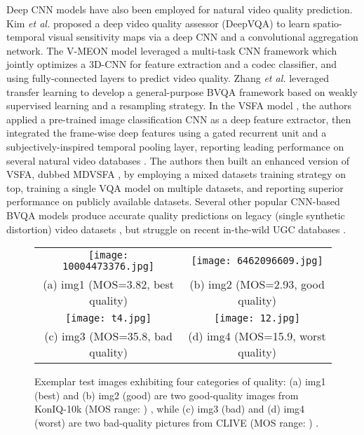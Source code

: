 \documentclass[transmag]{IEEEtran}
\begin{document}
Deep CNN models have also been employed for natural video quality
prediction. Kim \textit{et al.} \cite{kim2018deep} proposed a deep video quality assessor (DeepVQA) to learn spatio-temporal visual sensitivity maps via a deep CNN and a convolutional aggregation network. The V-MEON model \cite{liu2018end} leveraged a multi-task CNN framework which jointly optimizes a 3D-CNN for feature extraction and a codec classifier, and using fully-connected layers to predict video quality. Zhang \textit{et al.} \cite{zhang2018blind} leveraged transfer learning to develop a general-purpose BVQA framework based on weakly supervised learning and a resampling strategy. In the VSFA model \cite{li2019quality}, the authors applied a pre-trained image classification CNN as a deep feature extractor, then integrated the frame-wise deep features using a gated recurrent unit and a subjectively-inspired temporal pooling layer, reporting leading performance on several natural video databases \cite{nuutinen2016cvd2014, hosu2017konstanz, ghadiyaram2017capture}. The authors then built an enhanced version of VSFA, dubbed MDVSFA \cite{li2020unified}, by employing a mixed datasets training strategy on top, training a single VQA model on multiple datasets, and reporting superior performance on publicly available datasets. Several other popular CNN-based BVQA models \cite{kim2018deep, liu2018end, zhang2018blind, li2019quality, li2020unified} produce accurate quality predictions on legacy (single synthetic distortion) video datasets \cite{seshadrinathan2010study, vu2014vis3}, but struggle on recent in-the-wild UGC databases \cite{nuutinen2016cvd2014, ghadiyaram2017capture,hosu2017konstanz}.

\begin{figure}[!t]
\centering
\footnotesize
\def\xheight{0.485}
\def\xwidth{0.36}
\setlength{\tabcolsep}{1pt}
\begin{tabular}{cc}
\texttt{[image: 10004473376.jpg]} &
\texttt{[image: 6462096609.jpg]} \\
(a) img1 (MOS=3.82, best quality) & (b) img2 (MOS=2.93, good quality) \\
\texttt{[image: t4.jpg]} &
\texttt{[image: 12.jpg]} \\
(c) img3 (MOS=35.8, bad quality) & (d) img4 (MOS=15.9, worst quality) \\
\end{tabular}
\caption{Exemplar test images exhibiting four categories of quality: (a) img1 (best) and (b) img2 (good) are two good-quality images from KonIQ-10k (MOS range: ) \cite{hosu2020koniq}, while (c) img3 (bad) and (d) img4 (worst) are two bad-quality pictures from CLIVE (MOS range: ) \cite{ghadiyaram2015massive}.}
\label{fig:eg_imgs}
\end{figure}
\end{document}

